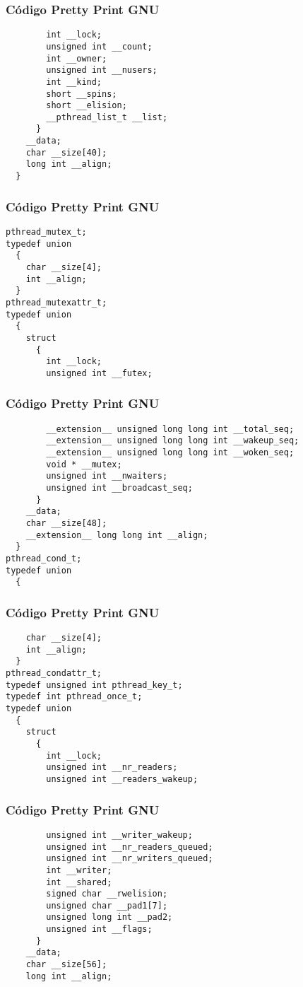 \documentclass{beamer}
\begin{document}
\begin{frame}[fragile]
\frametitle{C\'odigo Pretty Print GNU}
\begin{verbatim}
        int __lock;
        unsigned int __count;
        int __owner;
        unsigned int __nusers;
        int __kind;
        short __spins;
        short __elision;
        __pthread_list_t __list;
      }
    __data;
    char __size[40];
    long int __align;
  }
\end{verbatim}
\end{frame}
\begin{frame}[fragile]
\frametitle{C\'odigo Pretty Print GNU}
\begin{verbatim}
pthread_mutex_t;
typedef union
  {
    char __size[4];
    int __align;
  }
pthread_mutexattr_t;
typedef union
  {
    struct
      {
        int __lock;
        unsigned int __futex;
\end{verbatim}
\end{frame}
\begin{frame}[fragile]
\frametitle{C\'odigo Pretty Print GNU}
\begin{verbatim}
        __extension__ unsigned long long int __total_seq;
        __extension__ unsigned long long int __wakeup_seq;
        __extension__ unsigned long long int __woken_seq;
        void * __mutex;
        unsigned int __nwaiters;
        unsigned int __broadcast_seq;
      }
    __data;
    char __size[48];
    __extension__ long long int __align;
  }
pthread_cond_t;
typedef union
  {
    \end{verbatim}
\end{frame}
\begin{frame}[fragile]
\frametitle{C\'odigo Pretty Print GNU}
\begin{verbatim}
    char __size[4];
    int __align;
  }
pthread_condattr_t;
typedef unsigned int pthread_key_t;
typedef int pthread_once_t;
typedef union
  {
    struct
      {
        int __lock;
        unsigned int __nr_readers;
        unsigned int __readers_wakeup;
\end{verbatim}
\end{frame}
\begin{frame}[fragile]
\frametitle{C\'odigo Pretty Print GNU}
\begin{verbatim}
        unsigned int __writer_wakeup;
        unsigned int __nr_readers_queued;
        unsigned int __nr_writers_queued;
        int __writer;
        int __shared;
        signed char __rwelision;
        unsigned char __pad1[7];
        unsigned long int __pad2;
        unsigned int __flags;
      }
    __data;
    char __size[56];
    long int __align;
\end{verbatim}
\end{frame}
\end{document}
